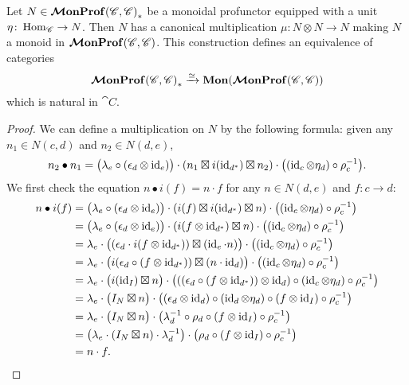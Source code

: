 \documentclass[12pt,oneside,article,draft]{memoir}
\begin{document}
\begin{proposition}\label{prop:unit_implies_monoid}
   Let $N\in\bm{\mathcal{M}}\mathbf{onProf}{(\mathscr{C},\mathscr{C})}_*$ be a monoidal profunctor equipped with a unit $\eta\colon\operatorname{Hom}_{\mathscr{C}}\to N$.
   Then $N$ has a canonical multiplication $\mu\colon N\otimes N\to N$ making $N$ a monoid in $\bm{\mathcal{M}}\mathbf{onProf}(\mathscr{C},\mathscr{C})$.
   This construction defines an equivalence of categories
      \[\bm{\mathcal{M}}\mathbf{onProf}{(\mathscr{C},\mathscr{C})}_*\xrightarrow{\simeq}\mathbf{Mon}(\bm{\mathcal{M}}\mathbf{onProf}(\mathscr{C},\mathscr{C}))\]
   which is natural in $\cat{C}$.
\end{proposition}
\begin{proof}
   We can define a multiplication on $N$ by the following formula: given any $n_1\in N(c,d)$ and $n_2\in N(d,e)$,
   \[
      n_2\bullet n_1 = \bigl(\lambda_e\circ(\epsilon_d\otimes\operatorname{id}_e)\bigr)\cdot(n_1\boxtimes i(\operatorname{id}_{d^*})\boxtimes n_2)\cdot\bigl((\operatorname{id}_c\otimes \eta_d)\circ\rho_c^{-1}\bigr).
   \]
   We first check the equation $n\bullet i(f)=n\cdot f$ for any $n\in N(d,e)$ and $f\colon c\to d$:
   \begin{align*}
      n\bullet i(f) &= \bigl(\lambda_e\circ(\epsilon_d\otimes\operatorname{id}_e)\bigr)\cdot(i(f)\boxtimes i(\operatorname{id}_{d^*})\boxtimes n)\cdot\bigl((\operatorname{id}_c\otimes \eta_d)\circ\rho_c^{-1}\bigr) \\
      &= \bigl(\lambda_e\circ(\epsilon_d\otimes\operatorname{id}_e)\bigr)\cdot(i(f\otimes\operatorname{id}_{d^*})\boxtimes n)\cdot\bigl((\operatorname{id}_c\otimes \eta_d)\circ\rho_c^{-1}\bigr) \\
      &= \lambda_e\cdot\bigl((\epsilon_d\cdot i(f\otimes \operatorname{id}_{d^*}))\boxtimes (\operatorname{id}_e\cdot n)\bigr)\cdot\bigl((\operatorname{id}_c\otimes \eta_d)\circ\rho_c^{-1}\bigr) \\
      &= \lambda_e\cdot\bigl(i(\epsilon_d\circ (f\otimes \operatorname{id}_{d^*}))\boxtimes (n\cdot\operatorname{id}_d)\bigr)\cdot\bigl((\operatorname{id}_c\otimes \eta_d)\circ\rho_c^{-1}\bigr) \\
      &= \lambda_e\cdot\bigl(i(\operatorname{id}_I)\boxtimes n\bigr)\cdot\bigl(((\epsilon_d\circ (f\otimes \operatorname{id}_{d^*}))\otimes\operatorname{id}_d)\circ(\operatorname{id}_c\otimes \eta_d)\circ\rho_c^{-1}\bigr) \\
      &= \lambda_e\cdot\bigl(I_N\boxtimes n\bigr)\cdot\bigl((\epsilon_d\otimes\operatorname{id}_d)\circ(\operatorname{id}_d\otimes\eta_d)\circ(f\otimes\operatorname{id}_I)\circ\rho_c^{-1}\bigr) \\
      &= \lambda_e\cdot\bigl(I_N\boxtimes n\bigr)\cdot\bigl(\lambda_d^{-1}\circ\rho_d\circ(f\otimes\operatorname{id}_I)\circ\rho_c^{-1}\bigr) \\
      &= \bigl(\lambda_e\cdot(I_N\boxtimes n)\cdot\lambda_d^{-1}\bigr)\cdot\bigl(\rho_d\circ(f\otimes\operatorname{id}_I)\circ\rho_c^{-1}\bigr) \\
      &= n\cdot f.
   \end{align*}


\end{proof}
\end{document}

